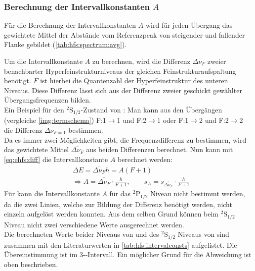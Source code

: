 \subsubsection*{Berechnung der Intervallkonstanten $A$}
Für die Berechnung der Intervallkonstanten $A$ wird für jeden Übergang das gewichtete Mittel der Abstände vom Referenzpeak 
von steigender und fallender Flanke gebildet (\autoref{tab:hfs:spectrum:avg}).

Um die Intervallkonstante $A$ zu berechnen, wird die Differenz $\Delta \nu_F$ zweier benachbarter Hyperfeinstrukturniveaus der 
gleichen Feinstrukturaufspaltung benötigt. $F$ ist hierbei die Quantenzahl der Hyperfeinstruktur des unteren Niveaus. 
Diese Differenz lässt sich aus der Differenz zweier geschickt gewählter Übergangsfrequenzen bilden. \\
Ein Beispiel für den ${}^2\text{S}_{1/2}$-Zustand von : Man kann aus den Übergängen (vergleiche \autoref{img:termschema}) 
F:1$\to$1 und F:2$\to$1 oder F:1$\to$2 und F:2$\to$2 die Differenz $\Delta \nu_{F=1}$ bestimmen. \\
Da es immer zwei Möglichkeiten gibt, die Frequenzdifferenz zu bestimmen, wird das gewichtete Mittel $\overline{\Delta \nu_F}$ aus beiden Differenzen berechnet. Nun kann mit 
\autoref{eq:ehfs:diff} die Intervallkonstante $A$ berechnet werden:
\begin{equation}
    \begin{split}
        & \Delta E = \overline{\Delta \nu_F} h = A (F+1) \\
    	& \Rightarrow A = \overline{\Delta \nu_F} \cdot \frac{h}{F + 1}, \qquad s_A = s_{\overline{\Delta \nu_F}} \cdot \frac{h}{F + 1}
    \end{split}
\end{equation}
Für  kann die Intervallkonstante $A$ für das ${}^2\text{P}_{1/2}$ Niveau nicht bestimmt werden, da die zwei Linien, welche zur 
Bildung der Differenz benötigt werden, nicht einzeln aufgelöst werden konnten. Aus dem selben Grund können beim ${}^2\text{S}_{1/2}$ Niveau nicht 
zwei verschiedene Werte ausgerechnet werden.\\
Die berechneten Werte beider Niveaus von  und des ${}^2\text{S}_{1/2}$ Niveaus von  sind zusammen mit den 
Literaturwerten \cite{manual} in \autoref{tab:hfs:intervalconsts} aufgelistet. 
Die Übereinstimmung ist im 3-\textsigma-Intervall. Ein möglicher Grund für die Abweichung ist oben beschrieben.
